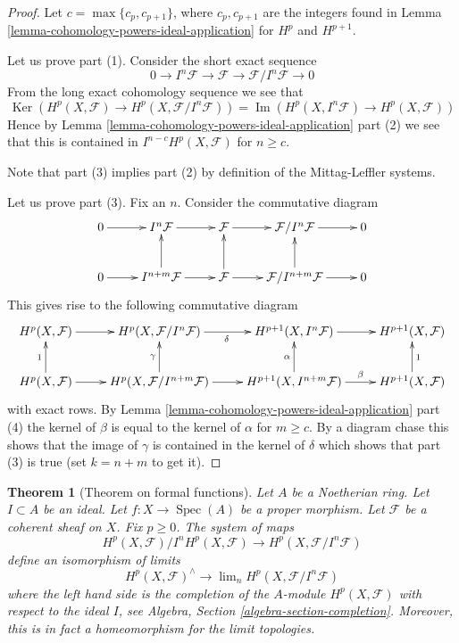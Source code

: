 \documentclass{stacks-project}
\theoremstyle{plain}
\newtheorem{theorem}[subsection]{Theorem}
\theoremstyle{definition}
\theoremstyle{remark}
\numberwithin{equation}{subsection}
\def\lim{\mathop{\mathrm{lim}}\nolimits}
\def\Spec{\mathop{\mathrm{Spec}}}
\def\Ker{\mathop{\mathrm{Ker}}}
\def\Im{\mathop{\mathrm{Im}}}
\begin{document}
\begin{proof}
Let $c = \max\{c_p, c_{p + 1}\}$, where $c_p, c_{p + 1}$ are the integers
found in Lemma \ref{lemma-cohomology-powers-ideal-application} for
$H^p$ and $H^{p + 1}$.

\medskip\noindent
Let us prove part (1). Consider the short exact sequence
$$
0 \to I^n\mathcal{F} \to \mathcal{F} \to \mathcal{F}/I^n\mathcal{F} \to 0
$$
From the long exact cohomology sequence we see that
$$
\Ker(
H^p(X, \mathcal{F}) \to H^p(X, \mathcal{F}/I^n\mathcal{F})
)
=
\Im(
H^p(X, I^n\mathcal{F}) \to H^p(X, \mathcal{F})
)
$$
Hence by Lemma \ref{lemma-cohomology-powers-ideal-application} part (2)
we see that this is contained in $I^{n - c}H^p(X, \mathcal{F})$ for $n \geq c$.

\medskip\noindent
Note that part (3) implies part (2) by definition of the Mittag-Leffler
systems.

\medskip\noindent
Let us prove part (3). Fix an $n$. Consider the commutative diagram
$$
\xymatrix{
0 \ar[r] &
I^n\mathcal{F} \ar[r] &
\mathcal{F} \ar[r] &
\mathcal{F}/I^n\mathcal{F} \ar[r] &
0 \\
0 \ar[r] &
I^{n + m}\mathcal{F} \ar[r] \ar[u] &
\mathcal{F} \ar[r] \ar[u] &
\mathcal{F}/I^{n + m}\mathcal{F} \ar[r] \ar[u] &
0
}
$$
This gives rise to the following commutative diagram
$$
\xymatrix{
H^p(X, \mathcal{F}) \ar[r] &
H^p(X, \mathcal{F}/I^n\mathcal{F}) \ar[r]_\delta &
H^{p + 1}(X, I^n\mathcal{F}) \ar[r] &
H^{p + 1}(X, \mathcal{F}) \\
H^p(X, \mathcal{F}) \ar[r] \ar[u]^1 &
H^p(X, \mathcal{F}/I^{n + m}\mathcal{F}) \ar[r] \ar[u]^\gamma &
H^{p + 1}(X, I^{n + m}\mathcal{F}) \ar[u]^\alpha \ar[r]^-\beta &
H^{p + 1}(X, \mathcal{F}) \ar[u]_1
}
$$
with exact rows. By
Lemma \ref{lemma-cohomology-powers-ideal-application} part (4) the kernel
of $\beta$ is equal to the kernel of $\alpha$ for $m \geq c$.
By a diagram chase this shows that the image of $\gamma$ is contained
in the kernel of $\delta$ which shows that part (3) is true
(set $k = n + m$ to get it).
\end{proof}

\begin{theorem}[Theorem on formal functions]
\label{theorem-formal-functions}
Let $A$ be a Noetherian ring.
Let $I \subset A$ be an ideal.
Let $f : X \to \Spec(A)$ be a proper morphism.
Let $\mathcal{F}$ be a coherent sheaf on $X$.
Fix $p \geq 0$.
The system of maps
$$
H^p(X, \mathcal{F})/I^nH^p(X, \mathcal{F})
\longrightarrow
H^p(X, \mathcal{F}/I^n\mathcal{F})
$$
define an isomorphism of limits
$$
H^p(X, \mathcal{F})^\wedge
\longrightarrow
\lim_n H^p(X, \mathcal{F}/I^n\mathcal{F})
$$
where the left hand side is the completion of the $A$-module
$H^p(X, \mathcal{F})$ with respect to the ideal $I$, see
Algebra, Section \ref{algebra-section-completion}.
Moreover, this is in fact a homeomorphism for the limit topologies.
\end{theorem}
\end{document}
